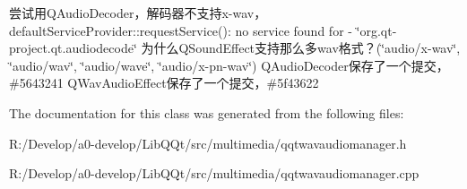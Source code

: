 尝试用\+Q\+Audio\+Decoder，解码器不支持x-\/wav，default\+Service\+Provider\+::request\+Service()\+: no service found for -\/ \char`\"{}org.\+qt-\/project.\+qt.\+audiodecode\char`\"{} 为什么\+Q\+Sound\+Effect支持那么多wav格式？(\char`\"{}audio/x-\/wav\char`\"{}, \char`\"{}audio/wav\char`\"{}, \char`\"{}audio/wave\char`\"{}, \char`\"{}audio/x-\/pn-\/wav\char`\"{}) Q\+Audio\+Decoder保存了一个提交，\#5643241 Q\+Wav\+Audio\+Effect保存了一个提交，\#5f43622 

The documentation for this class was generated from the following files\+:\begin{DoxyCompactItemize}
\item 
R\+:/\+Develop/a0-\/develop/\+Lib\+Q\+Qt/src/multimedia/qqtwavaudiomanager.\+h\item 
R\+:/\+Develop/a0-\/develop/\+Lib\+Q\+Qt/src/multimedia/qqtwavaudiomanager.\+cpp\end{DoxyCompactItemize}

